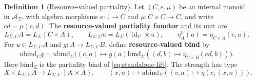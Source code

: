 \documentclass[11pt,a4paper]{article}
\numberwithin{algorithm}{section}
\numberwithin{equation}{section}
\theoremstyle{definition}
\newtheorem{definition}[definition]{Definition}
\theoremstyle{remark}
\theoremstyle{plain}
\newcommand{\AS}{\mathcal A_{\Sigma}}
\newcommand{\LL}{L_{\Sigma}}
\newcommand{\LC}{L_{\Sigma,C}}
\newcommand{\id}{\operatorname{id}}
\newcommand{\bind}{\mathbin{\mathrm{bind}}}
\theoremstyle{definition}
\theoremstyle{plain}
\begin{document}
\begin{definition}[Resource-valued partiality]\label{def:resource-partiality}
Let $(C,e,\mu)$ be an internal monoid in $\AS$, with algebra morphisms
$e:1\to C$ and $\mu:C\times C\to C$, and write $cd=\mu(c,d)$.
The \textbf{resource-valued partiality functor} and its unit are
\[
 \LC A=\LL(C\times A),\qquad
 \LC u=\LL(\id_C\times u),\qquad
 \eta^C_A(a)=\eta_{C\times A}(e,a).
\]
For $u\in\LC A$ and $g:A\to\LC B$, define \textbf{resource-valued bind} by
\begin{equation}\label{eq:cost-bind}
 u\bind_C g
 =u\bind_\Sigma\bigl((c,a)\mapsto
       g(a)\bind_\Sigma((d,b)\mapsto\eta_{C\times B}(cd,b))\bigr).
\end{equation}
Here $\bind_\Sigma$ is the partiality bind of \eqref{eq:standalone-lift}. The strength has type
\[
 X\times\LC A\longrightarrow\LC(X\times A),\qquad
 (x,u)\longmapsto
 u\bind_\Sigma((c,a)\mapsto\eta(c,(x,a))).
\]
\end{definition}
\end{document}
